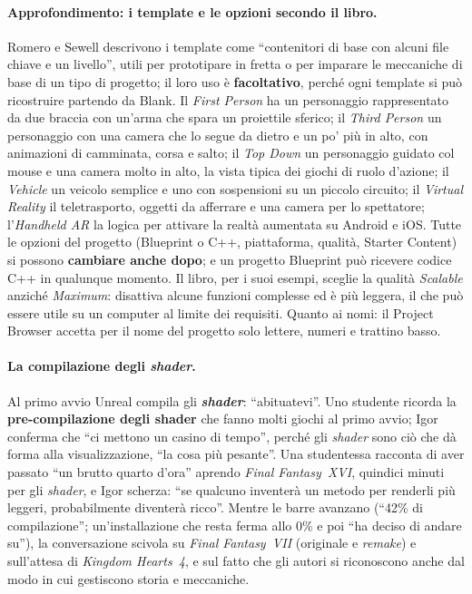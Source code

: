 \paragraph{Approfondimento: i template e le opzioni secondo il libro.} Romero e Sewell
descrivono i template come ``contenitori di base con alcuni file chiave e un livello'',
utili per prototipare in fretta o per imparare le meccaniche di base di un tipo di
progetto; il loro uso è \textbf{facoltativo}, perché ogni template si può ricostruire
partendo da Blank. Il \emph{First Person} ha un personaggio rappresentato da due braccia
con un'arma che spara un proiettile sferico; il \emph{Third Person} un personaggio con
una camera che lo segue da dietro e un po' più in alto, con animazioni di camminata,
corsa e salto; il \emph{Top Down} un personaggio guidato col mouse e una camera molto in
alto, la vista tipica dei giochi di ruolo d'azione; il \emph{Vehicle} un veicolo
semplice e uno con sospensioni su un piccolo circuito; il \emph{Virtual Reality} il
teletrasporto, oggetti da afferrare e una camera per lo spettatore; l'\emph{Handheld
AR} la logica per attivare la realtà aumentata su Android e iOS. Tutte le opzioni del
progetto (Blueprint o C++, piattaforma, qualità, Starter Content) si possono
\textbf{cambiare anche dopo}; e un progetto Blueprint può ricevere codice C++ in
qualunque momento. Il libro, per i suoi esempi, sceglie la qualità \emph{Scalable}
anziché \emph{Maximum}: disattiva alcune funzioni complesse ed è più leggera, il che può
essere utile su un computer al limite dei requisiti. Quanto ai nomi: il Project Browser
accetta per il nome del progetto solo lettere, numeri e trattino basso.

\paragraph{La compilazione degli \emph{shader}.} Al primo avvio Unreal compila gli
\textbf{\emph{shader}}: ``abituatevi''. Uno studente ricorda la \textbf{pre-compilazione
degli shader} che fanno molti giochi al primo avvio; Igor conferma che ``ci mettono un
casino di tempo'', perché gli \emph{shader} sono ciò che dà forma alla visualizzazione,
``la cosa più pesante''. Una studentessa racconta di aver passato ``un brutto quarto
d'ora'' aprendo \emph{Final Fantasy~XVI}, quindici minuti per gli \emph{shader}, e Igor
scherza: ``se qualcuno inventerà un metodo per renderli più leggeri, probabilmente
diventerà ricco''. Mentre le barre avanzano (``42\% di compilazione''; un'installazione
che resta ferma allo 0\% e poi ``ha deciso di andare su''), la conversazione scivola su
\emph{Final Fantasy~VII} (originale e \emph{remake}) e sull'attesa di \emph{Kingdom
Hearts~4}, e sul fatto che gli autori si riconoscono anche dal modo in cui gestiscono
storia e meccaniche.

